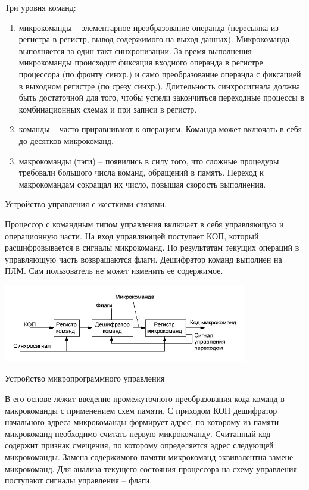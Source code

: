 \documentclass[unicode, 12pt, a4paper, oneside]{article}
\begin{document}
Три уровня команд:
\begin{enumerate}
\item микрокоманды – элементарное преобразование операнда (пересылка из регистра в регистр, вывод содержимого на выход данных). Микрокоманда выполняется за один такт синхронизации. За время выполнения микрокоманды происходит фиксация входного операнда в регистре процессора (по фронту синхр.) и само преобразование операнда с фиксацией в выходном регистре (по срезу синхр.). Длительность синхросигнала должна быть достаточной для того, чтобы успели закончиться переходные процессы в комбинационных схемах и при записи в регистр.
\item команды – часто приравнивают к операциям. Команда может включать в себя до десятков микрокоманд.
\item макрокоманды (тэги) – появились в силу того, что сложные процедуры требовали большого числа команд, обращений в память. Переход к макрокомандам сокращал их число, повышая скорость выполнения.
\end{enumerate}

Устройство управления с жесткими связями.

Процессор с командным типом управления включает в себя управляющую и операционную части. На вход управляющей поступает КОП, который расшифровывается в сигналы микрокоманд. По результатам текущих операций в управляющую часть возвращаются флаги.
Дешифратор команд выполнен на ПЛМ. Сам пользователь не может изменить ее содержимое.

\begin{center}
\includegraphics[width=0.8\textwidth]{120_microcom.png}
\end{center}
Устройство микропрограммного управления

В его основе лежит введение промежуточного преобразования кода команд в микрокоманды с применением схем памяти. С приходом КОП дешифратор начального адреса микрокоманды формирует адрес, по которому из памяти микрокоманд необходимо считать первую микрокоманду. Считанный код содержит признак смещения, по которому определяется адрес следующей микрокоманды. Замена содержимого памяти микрокоманд эквивалентна замене микрокоманд. Для анализа текущего состояния процессора на схему управления поступают сигналы управления – флаги.
\end{document}
